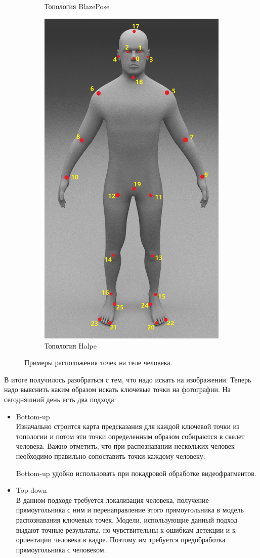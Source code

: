 \begin{figure}[h]
\begin{subfigure}[b]{.3\textwidth}
   \caption{Топология BlazePose }
   \label{fig:BlazePose_topology}
\end{subfigure}
\begin{subfigure}[b]{.3\textwidth}
	\centering
   \includegraphics[height=\textwidth]{./images/Halpe_topology.jpg}
   \caption{Топология Halpe}
   \label{fig:Halpe_topology}
\end{subfigure}
   \caption{Примеры расположения точек на теле человека.}
\end{figure}

В итоге получилось разобраться с тем, что надо искать на изображении. Теперь надо выяснить каким образом искать ключевые точки на фотографии. На сегодняшний день есть два подхода:

\begin{itemize}
	\item Bottom-up\\
	Изначально строится карта предсказания для каждой ключевой точки из топологии и потом эти точки определенным образом собираются в скелет человека. Важно отметить, что при распознавании нескольких человек необходимо правильно сопоставить точки каждому человеку.
	
	Bottom-up удобно использовать при покадровой обработке видеофрагментов.
	\item Top-down\\
	В данном подходе требуется локализация человека, получение прямоугольника с ним и перенаправление этого прямоугольника в модель распознавания ключевых точек.
	Модели, использующие данный подход выдают точные результаты, но чувствительны к ошибкам детекции и к ориентации человека в кадре. Поэтому им требуется предобработка прямоугольника с человеком.
\end{itemize}

